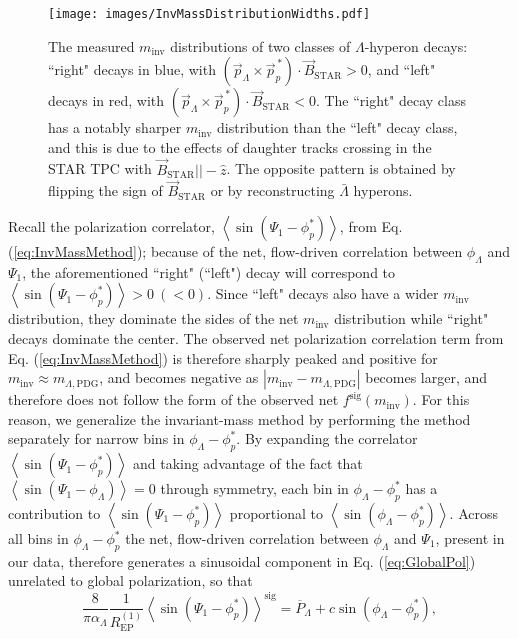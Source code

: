 \documentclass[
  reprint,
  superscriptaddress,
  amsmath,
  amssymb,
  aps,
  floatfix,
]{revtex4-2}
\newcommand{\proton}{p}
\newcommand{\REP}{R_\mathrm{EP}^{(1)}}
\newcommand{\InvMass}{m_\mathrm{inv}}
\newcommand{\pstar}{_\proton^{*}}
\newcommand{\PpStar}{\vec{p}_\proton^{\,*}} %
\newcommand{\PsiEP}{\Psi_{1}}
\newcommand{\PLambda}{\overline{P}_{\Lambda}}
\newcommand{\sig}{^\mathrm{sig}}
\newcommand{\BSTAR}{\vec{B}_\mathrm{STAR}}
\newcommand{\AzimuthalEmissionAngle}{\phi_\Lambda-\phi\pstar}
\newcommand{\PolarizationCorrelationTerm}{\left<\sin(\PsiEP-\phi\pstar)\right>}
\newcommand{\LambdaPdgMass}{m_{\Lambda, \mathrm{PDG}}}
\newcommand{\RightLeftTripleProduct}{\left(\vec{p}_\Lambda\times\PpStar\right)\cdot\BSTAR}
\begin{document}
\begin{figure}[!t]
  \centering
  \texttt{[image: images/InvMassDistributionWidths.pdf]}
  \caption{The measured $\InvMass$ distributions of
 two classes of $\Lambda$-hyperon decays: ``right"
 decays in blue, with $\RightLeftTripleProduct>0$, and
 ``left" decays in red, with $\RightLeftTripleProduct<0$.
 The ``right" decay class has a
 notably sharper $\InvMass$ distribution than the
 ``left" decay class, and this is
 due to the effects of daughter
 tracks crossing in the STAR TPC
 with $\BSTAR||-\hat{z}$. The opposite pattern is
 obtained by flipping the sign of
 $\BSTAR$ or by reconstructing $\bar{\Lambda}$ hyperons.}
  \label{fig:InvMassDistributionWidths}
\end{figure}

Recall the polarization correlator, $\PolarizationCorrelationTerm$, from
 Eq. (\ref{eq:InvMassMethod}); because of the net, flow-driven
 correlation between $\phi_\Lambda$ and $\PsiEP$, the
 aforementioned ``right" (``left") decay will correspond
 to $\PolarizationCorrelationTerm>0\:(<0)$. Since ``left" decays also
 have a wider $\InvMass$ distribution, they
 dominate the sides of the net
 $\InvMass$ distribution while ``right" decays dominate
 the center. The observed net polarization
 correlation term from Eq. (\ref{eq:InvMassMethod}) is therefore
 sharply peaked and positive for $\InvMass\approx\LambdaPdgMass$,
 and becomes negative as $|\InvMass-\LambdaPdgMass|$ becomes
 larger, and therefore does not follow
 the form of the observed net
 $f\sig\left(\InvMass\right)$. For this reason, we generalize
 the invariant-mass method by performing the
 method separately for narrow bins in
 $\AzimuthalEmissionAngle$.
 By expanding the correlator $\PolarizationCorrelationTerm$ 
 and taking advantage of the fact that $\left<\sin(\PsiEP-\phi_\Lambda)\right>=0$
 through symmetry, each bin in $\AzimuthalEmissionAngle$ has a contribution to $\PolarizationCorrelationTerm$
 proportional to $\left<\sin(\phi_\Lambda-\phi\pstar)\right>$.
 Across all bins in $\AzimuthalEmissionAngle$
 the net, flow-driven correlation between
 $\phi_\Lambda$ and $\PsiEP$, present in our
 data, therefore generates a sinusoidal component in
 Eq. (\ref{eq:GlobalPol}) unrelated to global polarization, so that
\begin{equation}
\label{eq:SineDependence}
  \frac{8}{\pi\alpha_\Lambda}\frac{1}{\REP}\left\langle\sin\left(\PsiEP-\phi\pstar\right)\right\rangle\sig = \PLambda  +c\sin(\AzimuthalEmissionAngle),
\end{equation}
\end{document}

